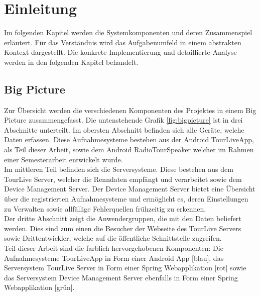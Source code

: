 \chapter{Einleitung}

Im folgenden Kapitel werden die Systemkomponenten und deren Zusammenspiel erläutert. Für das Verständnis wird das Aufgabenumfeld in einem abstrakten Kontext dargestellt. Die konkrete Implementierung und detaillierte Analyse werden in den folgenden Kapitel behandelt.

\section{Big Picture}
Zur Übersicht werden die verschiedenen Komponenten des Projektes in einem Big Picture zusammengefasst. Die untenstehende Grafik \ref{fig:bigpicture} ist in drei Abschnitte unterteilt. Im obersten Abschnitt befinden sich alle Geräte, welche Daten erfassen. Diese Aufnahmesysteme bestehen aus der Android TourLiveApp, als Teil dieser Arbeit, sowie dem Android RadioTourSpeaker welcher im Rahmen einer Semesterarbeit \cite{radiotourspeaker2012} entwickelt wurde.\\

Im mittleren Teil befinden sich die Serversysteme. Diese bestehen aus dem TourLive Server, welcher die Renndaten empfängt und verarbeitet sowie dem Device Management Server. Der Device Management Server bietet eine Übersicht über die registrierten Aufnahmesysteme und ermöglicht es, deren Einstellungen zu Verwalten sowie allfällige Fehlerquellen frühzeitig zu erkennen.\\

Der dritte Abschnitt zeigt die Anwendergruppen, die mit den Daten beliefert werden. Dies sind zum einen die Besucher der Webseite des TourLive Servers sowie Drittentwickler, welche auf die öffentliche Schnittstelle zugreifen.\\

Teil dieser Arbeit sind die farblich hervorgehobenen Komponenten: Die Aufnahmesysteme TourLiveApp in Form einer Android App [blau], das Serversystem TourLive Server in Form einer Spring Webapplikation [rot] sowie das Serversystem Device Management Server ebenfalls in Form einer Spring Webapplikation [grün].

